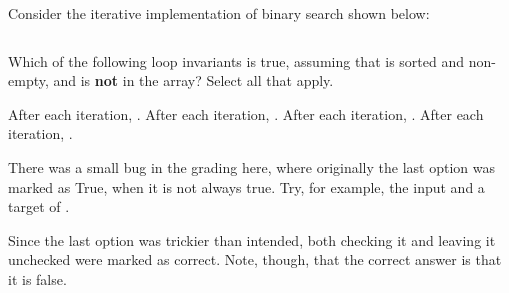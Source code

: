 \begin{prob}
    Consider the iterative implementation of binary search shown below:
    \inputminted[lastline=17]{python}{\thisdir/code.py}

    Which of the following loop invariants is true, assuming that
     is sorted and non-empty, and  is \textbf{not} in the array? Select all that apply.

    \begin{choices}[rectangle]
        \correctchoice  After each iteration, .
        \choice  After each iteration, .
        \choice  After each iteration, .
        \choice  After each iteration, .
    \end{choices}

    \begin{soln}
        There was a small bug in the grading here, where originally the last option was
        marked as True, when it is not always true. Try, for example, the input
         and a target of .

        Since the last option was trickier than intended, both checking it and leaving it
        unchecked were marked as correct. Note, though, that the correct answer is that it
        is false.
    \end{soln}
\end{prob}
